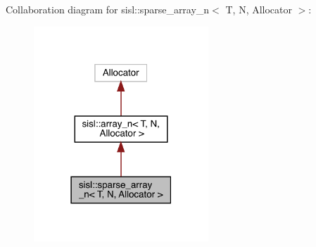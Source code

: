 Collaboration diagram for sisl\+:\+:sparse\+\_\+array\+\_\+n$<$ T, N, Allocator $>$\+:\nopagebreak
\begin{figure}[H]
\begin{center}
\leavevmode
\includegraphics[width=186pt]{classsisl_1_1sparse__array__n__coll__graph}
\end{center}
\end{figure}
